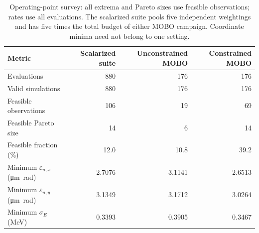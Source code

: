 \begin{table}[htbp]
\centering\small
\caption{Operating-point survey: all extrema and Pareto sizes use feasible observations; rates use all evaluations. The scalarized suite pools five independent weightings and has five times the total budget of either MOBO campaign. Coordinate minima need not belong to one setting.}
\label{tab:campaign_summary}
\begin{tabular}{lrrr}\toprule
Metric & Scalarized suite & Unconstrained MOBO & Constrained MOBO \\
\midrule
Evaluations & 880 & 176 & 176 \\
Valid simulations & 880 & 176 & 176 \\
Feasible observations & 106 & 19 & 69 \\
Feasible Pareto size & 14 & 6 & 14 \\
Feasible fraction (\%) & 12.0 & 10.8 & 39.2 \\
Minimum $\varepsilon_{n,x}$ (\si{\micro\metre\radian}) & 2.7076 & 3.1141 & 2.6513 \\
Minimum $\varepsilon_{n,y}$ (\si{\micro\metre\radian}) & 3.1349 & 3.1712 & 3.0264 \\
Minimum $\sigma_E$ (\si{\mega\electronvolt}) & 0.3393 & 0.3905 & 0.3467 \\
\bottomrule\end{tabular}\end{table}
